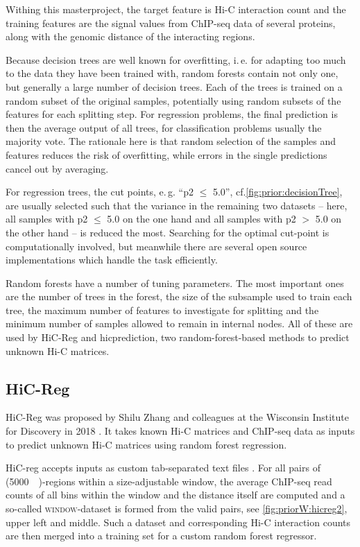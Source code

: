 Withing this masterproject, the target feature is Hi-C interaction count
and the training features are the signal values from ChIP-seq data of several proteins,
along with the genomic distance of the interacting regions.

Because decision trees are well known for overfitting, i.\,e. for adapting too much
to the data they have been trained with,
random forests contain not only one, but generally a large number of decision trees.
Each of the trees is trained on a random subset of the original samples, potentially using random subsets
of the features for each splitting step.
For regression problems, the final prediction is then the average output of all trees, 
for classification problems usually the majority vote.
The rationale here is that random selection of the samples and features reduces the risk of overfitting,
while errors in the single predictions cancel out by averaging.

For regression trees, the cut points, e.\,g. ``p2 $\leq$ 5.0'', cf.\;\autoref{fig:prior:decisionTree}, 
are usually selected such that the variance in the remaining two datasets -- here, 
all samples with p2 $\leq$ 5.0 on the one hand and all samples with p2 $>$ 5.0 on
the other hand -- is reduced the most.
Searching for the optimal cut-point is computationally involved,
but meanwhile there are several open source implementations which handle the task efficiently.

Random forests have a number of tuning parameters. 
The most important ones are the number of trees in the forest, 
the size of the subsample used to train each tree,
the maximum number of features to investigate for splitting
and the minimum number of samples allowed to remain in internal nodes.
All of these are used by HiC-Reg and hicprediction, two random-forest-based methods
to predict unknown Hi-C matrices.


\subsection{HiC-Reg}
HiC-Reg was proposed by Shilu Zhang and colleagues at the Wisconsin Institute for Discovery in 2018 \cite{Zhang2019, Zhang2018}.
It takes known Hi-C matrices and ChIP-seq data as inputs to predict unknown Hi-C matrices using random forest regression.

HiC-reg accepts inputs as custom tab-separated text files \cite{Roy2020}.
For all pairs of (\SI{5000}{\kilo\bp})-regions within a size-adjustable window, the average
ChIP-seq read counts of all bins within the window and the distance itself 
are computed and a so-called \textsc{window}-dataset is formed from the valid pairs, see \autoref{fig:priorW:hicreg2}, upper left and middle.
Such a dataset and corresponding Hi-C interaction counts are then merged into a training set
for a custom random forest regressor. 

